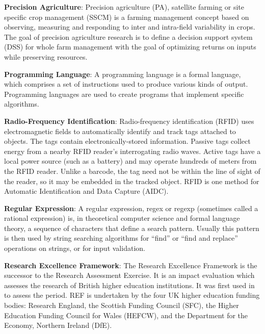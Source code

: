 \documentclass[b5paper,]{book}
\theoremstyle{definition}
\theoremstyle{definition}
\theoremstyle{definition}
\theoremstyle{remark}
\begin{document}
\textbf{Precision Agriculture}: Precision agriculture (PA), satellite
farming or site specific crop management (SSCM) is a farming management
concept based on observing, measuring and responding to inter and
intra-field variability in crops. The goal of precision agriculture
research is to define a decision support system (DSS) for whole farm
management with the goal of optimizing returns on inputs while
preserving resources.

\textbf{Programming Language}: A programming language is a formal
language, which comprises a set of instructions used to produce various
kinds of output. Programming languages are used to create programs that
implement specific algorithms.

\textbf{Radio-Frequency Identification}: Radio-frequency identification
(RFID) uses electromagnetic fields to automatically identify and track
tags attached to objects. The tags contain electronically-stored
information. Passive tags collect energy from a nearby RFID reader's
interrogating radio waves. Active tags have a local power source (such
as a battery) and may operate hundreds of meters from the RFID reader.
Unlike a barcode, the tag need not be within the line of sight of the
reader, so it may be embedded in the tracked object. RFID is one method
for Automatic Identification and Data Capture (AIDC).

\textbf{Regular Expression}: A regular expression, regex or regexp
(sometimes called a rational expression) is, in theoretical computer
science and formal language theory, a sequence of characters that define
a search pattern. Usually this pattern is then used by string searching
algorithms for ``find'' or ``find and replace'' operations on strings,
or for input validation.

\textbf{Research Excellence Framework}: The Research Excellence
Framework is the successor to the Research Assessment Exercise. It is an
impact evaluation which assesses the research of British higher
education institutions. It was first used in to assess the period. REF
is undertaken by the four UK higher education funding bodies: Research
England, the Scottish Funding Council (SFC), the Higher Education
Funding Council for Wales (HEFCW), and the Department for the Economy,
Northern Ireland (DfE).
\end{document}
